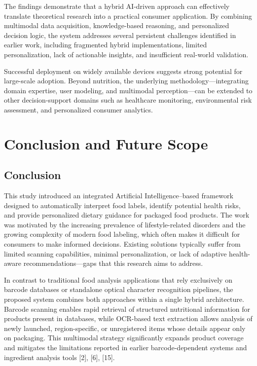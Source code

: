 \documentclass[conference]{IEEEtran}
\begin{document}
The findings demonstrate that a hybrid AI-driven approach can effectively translate theoretical research into a practical consumer application. By combining multimodal data acquisition, knowledge-based reasoning, and personalized decision logic, the system addresses several persistent challenges identified in earlier work, including fragmented hybrid implementations, limited personalization, lack of actionable insights, and insufficient real-world validation.

Successful deployment on widely available devices suggests strong potential for large-scale adoption. Beyond nutrition, the underlying methodology—integrating domain expertise, user modeling, and multimodal perception—can be extended to other decision-support domains such as healthcare monitoring, environmental risk assessment, and personalized consumer analytics.


\section{Conclusion and Future Scope}

\subsection{Conclusion}

This study introduced an integrated Artificial Intelligence–based framework designed to automatically interpret food labels, identify potential health risks, and provide personalized dietary guidance for packaged food products. The work was motivated by the increasing prevalence of lifestyle-related disorders and the growing complexity of modern food labeling, which often makes it difficult for consumers to make informed decisions. Existing solutions typically suffer from limited scanning capabilities, minimal personalization, or lack of adaptive health-aware recommendations—gaps that this research aims to address.

In contrast to traditional food analysis applications that rely exclusively on barcode databases or standalone optical character recognition pipelines, the proposed system combines both approaches within a single hybrid architecture. Barcode scanning enables rapid retrieval of structured nutritional information for products present in databases, while OCR-based text extraction allows analysis of newly launched, region-specific, or unregistered items whose details appear only on packaging. This multimodal strategy significantly expands product coverage and mitigates the limitations reported in earlier barcode-dependent systems and ingredient analysis tools [2], [6], [15].
\end{document}
